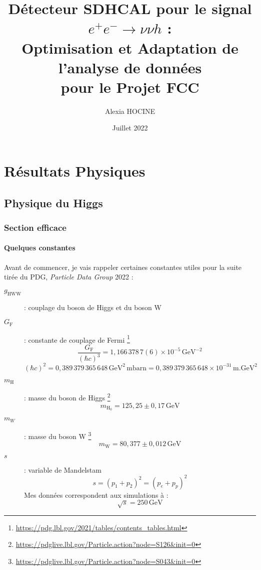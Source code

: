 \documentclass[10pt,a4paper]{report}
\author{Alexia \textsc{HOCINE}}
\title{
	Détecteur SDHCAL pour le signal  $ e^{+} e^{-} \longrightarrow \nu \nu h $ :\\
	Optimisation et Adaptation de l'analyse de données\\pour le Projet FCC 
}
\date{Juillet 2022}
\newcommand{\GeV}{\mathrm{GeV}\xspace}
\newcommand{\mH}{m_\mathrm{H}}
\newcommand{\vhc}{0,389\,379\,365\,648} %
\newcommand{\GF}{G_\mathrm{F}}
\newcommand{\gHWW}{g_\mathrm{HWW}}
\begin{document}






\tableofcontents








\chapter{Résultats Physiques}

\section{Physique du Higgs}

\subsection{Section efficace}


\subsubsection{Quelques constantes}
Avant de commencer, je vais rappeler certaines constantes utiles pour la suite tirée du PDG, \textit{Particle Data Group} 2022\cite{Workman:2022ynf} :
\begin{description}

	\item[$\gHWW$] : couplage du boson de Higgs et du boson W

	\item[$\GF$] : constante de couplage de Fermi
	\footnote{\url{https://pdg.lbl.gov/2021/tables/contents_tables.html}}
	$$ \frac{G_\mathrm{F}}{\left(\hbar c\right)^3} = 1,166\,378\,7(6) \times 10^{-5}\, \GeV^{-2} $$
	$$ (\hbar c)^2 = \vhc \, \GeV^2 \, \mathrm{mbarn} = \vhc \times 10^{-31} \, \mathrm{m}.\GeV^2 $$
	
	\item[$\mH$] : masse du boson de Higgs
	\footnote{\url{https://pdglive.lbl.gov/Particle.action?node=S126&init=0}}
	$$ m_\mathrm{H_0} = 125,25 \pm 0,17 \, \GeV $$
		
	\item[$m_W$] : masse du boson W
	\footnote{\url{https://pdglive.lbl.gov/Particle.action?node=S043&init=0}}
	$$ m_\mathrm{W} = 80,377 \pm 0,012 \, \GeV $$
	
	\item[$s$] : variable de Mandelstam
	$$ s = \left(p_1 + p_2\right)^2 = \left(p_{e} + p_{p}\right)^2 $$
	Mes données correspondent aux simulations à : 
	$$ \sqrt{s} = 250\, \GeV $$

		
\end{description}
\end{document}
